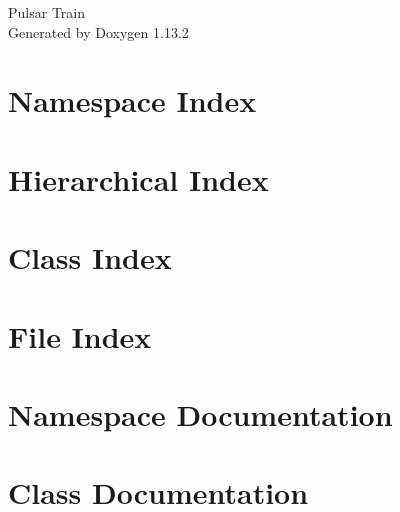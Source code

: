 \documentclass[twoside]{book}
\newcommand{\+}{\discretionary{\mbox{\scriptsize$\hookleftarrow$}}{}{}}
\newcommand{\clearemptydoublepage}{%
    \newpage{\pagestyle{empty}\cleardoublepage}%
  }
\begin{document}
  \raggedbottom
    \hypersetup{pageanchor=false,
                bookmarksnumbered=true,
                pdfencoding=unicode
               }
  \begin{titlepage}
  \vspace*{7cm}
  \begin{center}%
  {\Large Pulsar Train}\\
  \vspace*{1cm}
  {\large Generated by Doxygen 1.13.2}\\
  \end{center}
  \end{titlepage}
  \clearemptydoublepage
  \tableofcontents
  \clearemptydoublepage
  \hypersetup{pageanchor=true}
\chapter{Namespace Index}

\chapter{Hierarchical Index}

\chapter{Class Index}

\chapter{File Index}

\chapter{Namespace Documentation}

\chapter{Class Documentation}













\end{document}
